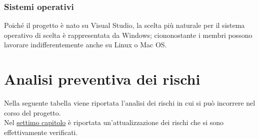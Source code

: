 \subsubsection{Sistemi operativi}
Poiché il progetto è nato su Visual Studio, la scelta più naturale per il sistema operativo di scelta è rappresentata da Windows; ciononostante i membri possono lavorare indifferentemente anche su Linux o Mac OS.

\newpage
\section{Analisi preventiva dei rischi}
Nella seguente tabella viene riportata l'analisi dei rischi in cui si può incorrere nel corso del progetto.\\
Nel {\hyperref[cap:conclusioni]{settimo capitolo}}
è riportata un'attualizzazione dei rischi che si sono effettivamente verificati.
